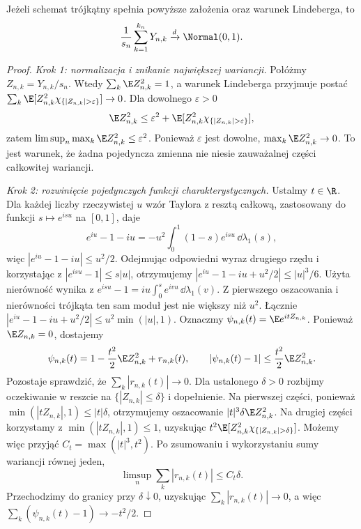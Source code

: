 \begin{twierdzenie}
Jeżeli schemat trójkątny spełnia powyższe założenia
oraz warunek Lindeberga, to
\[
\frac{1}{s_n}\sum_{k=1}^{k_n}Y_{n,k}
\xrightarrow{d}\Normal(0,1).
\]
\end{twierdzenie}
\begin{proof}
\emph{Krok 1: normalizacja i znikanie największej
wariancji.} Połóżmy $Z_{n,k}=Y_{n,k}/s_n$.
Wtedy $\sum_k\E Z_{n,k}^2=1$, a warunek Lindeberga
przyjmuje postać
$\sum_k\E[Z_{n,k}^2\chi_{\{|Z_{n,k}|>\varepsilon\}}]\to0$.
Dla dowolnego $\varepsilon>0$
\[
\E Z_{n,k}^2\leq\varepsilon^2+
\E[Z_{n,k}^2\chi_{\{|Z_{n,k}|>\varepsilon\}}],
\]
zatem $\limsup_n\max_k\E Z_{n,k}^2\leq\varepsilon^2$.
Ponieważ $\varepsilon$ jest dowolne,
$\max_k\E Z_{n,k}^2\to0$. To jest warunek,
że żadna pojedyncza zmienna nie niesie zauważalnej
części całkowitej wariancji.

\emph{Krok 2: rozwinięcie pojedynczych funkcji
charakterystycznych.} Ustalmy $t\in\R$.
Dla każdej liczby rzeczywistej $u$ wzór Taylora
z resztą całkową, zastosowany do funkcji
$s\mapsto e^{isu}$ na $[0,1]$, daje
\[
e^{iu}-1-iu=-u^2\int_0^1(1-s)e^{isu}\,\dd\lambda_1(s),
\]
więc $|e^{iu}-1-iu|\leq u^2/2$. Odejmując
odpowiedni wyraz drugiego rzędu i korzystając
z $|e^{isu}-1|\leq s|u|$, otrzymujemy
$|e^{iu}-1-iu+u^2/2|\leq |u|^3/6$.
Użyta nierówność wynika z
$e^{isu}-1=iu\int_0^s e^{ivu}\,\dd\lambda_1(v)$.
Z pierwszego oszacowania i nierówności trójkąta
ten sam moduł jest nie większy niż $u^2$.
Łącznie
$|e^{iu}-1-iu+u^2/2|\leq u^2\min(|u|,1)$.
Oznaczmy $\psi_{n,k}(t)=\E e^{itZ_{n,k}}$.
Ponieważ $\E Z_{n,k}=0$, dostajemy
\[
\psi_{n,k}(t)=1-\frac{t^2}{2}\E Z_{n,k}^2+r_{n,k}(t),
\qquad
|\psi_{n,k}(t)-1|\leq\frac{t^2}{2}\E Z_{n,k}^2.
\]
Pozostaje sprawdzić, że $\sum_k|r_{n,k}(t)|\to0$.
Dla ustalonego $\delta>0$ rozbijmy oczekiwanie
w reszcie na $\{|Z_{n,k}|\leq\delta\}$ i dopełnienie.
Na pierwszej części, ponieważ
$\min(|tZ_{n,k}|,1)\leq |t|\delta$,
otrzymujemy oszacowanie $|t|^3\delta\E Z_{n,k}^2$.
Na drugiej części korzystamy z
$\min(|tZ_{n,k}|,1)\leq1$, uzyskując
$t^2\E[Z_{n,k}^2\chi_{\{|Z_{n,k}|>\delta\}}]$.
Możemy więc przyjąć $C_t=\max(|t|^3,t^2)$. Po zsumowaniu
i wykorzystaniu sumy wariancji równej jeden,
\[
\limsup_n\sum_k|r_{n,k}(t)|\leq C_t\delta.
\]
Przechodzimy do granicy przy $\delta\downarrow0$, uzyskując
$\sum_k|r_{n,k}(t)|\to0$, a więc
$\sum_k(\psi_{n,k}(t)-1)\to-t^2/2$.


\end{proof}
